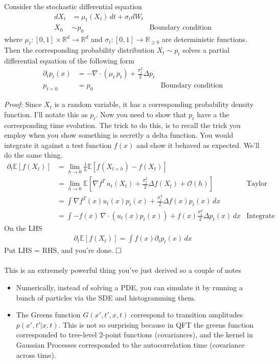 \begin{theorem}
	Consider the stochastic differential equation
	\begin{align}
		dX_t & = \mu_t(X_t) \, dt + \sigma_t dW_t\\
		X_0 & \sim p_0 & \text{Boundary condition}
	\end{align}
	where $\mu_t : [0,1] \times \mathbb R^d \to \mathbb R^d$ and $\sigma_t : [0,1] \to \mathbb R_{\geq 0}$ are deterministic functions. Then the corresponding probability distribution $X_t \sim p_t$ solves a partial differential equation of the following form
	\begin{align}
		\partial_t p_t(x) & = - \nabla \cdot (\mu_t\, p_t) + \frac{\sigma_t^2}{2} \Delta p_t\\
		p_{t=0} & = p_0 & \text{Boundary condition}
	\end{align}
\end{theorem}
\emph{Proof:}  Since $X_t$ is a random variable, it has a corresponding probability density function. I'll notate this as $p_t$. Now you need to show that $p_t$ have a the corresponding time evolution. The trick to do this, is to recall the trick you employ when you show something is secretly a delta function. You would integrate it against a test function $f(x)$ and show it behaved as expected. We'll do the same thing.
\begin{align}
	\partial_t \mathbb E[f(X_t)] & = \lim_{h \to 0} \frac{1}{h} \mathbb E[f(X_{t+h}) - f(X_t)] \\
	& = \lim_{h \to 0} \mathbb E[\nabla f^T\, u_t(X_t) + \frac{\sigma^2_t}{2} \Delta f(X_t) + \mathcal O(h)] & \text{Taylor expand}\\
	& = \int \nabla f^T (x) u_t(x) p_t(x) +  \frac{\sigma^2_t}{2} \Delta f(x)  p_t(x) \, dx\\
	& = \int -f(x) \, \nabla \cdot (u_t(x) p_t(x)) + f(x) \frac{\sigma^2_t}{2} \Delta p_t(x)\, dx & \text{Integrate by parts}
\end{align}
On the LHS
\begin{align}
	\partial_t \mathbb E[f(X_t)] = \int f(x) \partial_t p_t(x) \, dx
\end{align}
Put LHS = RHS, and you're done. $\hfill \Box$
\\
\\
This is an extremely powerful thing you've just derived so a couple of notes
\begin{itemize}
	\item Numerically, instead of solving a PDE, you can simulate it by running a bunch of particles via the SDE and histogramming them. 
	\item The Greens function $G(x',t',x,t)$ correspond to transition amplitudes $p(x', t' | x, t)$. This is not so surprising because in QFT the greens function corresponded to tree-level 2-point functions (covariances), and the kernel in Gaussian Processes corresponded to the autocorrelation time (covariance across time). 
\end{itemize}


